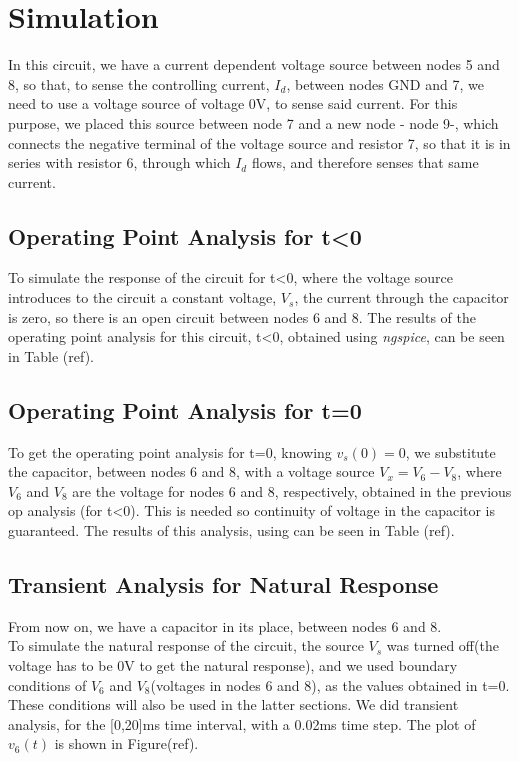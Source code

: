 \section{Simulation}
\label{sec:simulation}
In this circuit, we have a current dependent voltage source between nodes 5 and 8, so that, to sense the controlling current, $I_d$, between nodes GND and 7, we need to use a voltage source of voltage 0V, to sense said current. For this purpose, we placed this source between node 7 and a new node - node 9-, which connects the negative terminal of the voltage source and resistor 7, so that it is in series with resistor 6, through which $I_d$ flows, and therefore senses that same current.\\
\subsection{Operating Point Analysis for t\textless0}
To simulate the response of the circuit for t\textless0, where the voltage source introduces to the circuit a constant voltage, $V_s$, the current through the capacitor is zero, so there is an open circuit between nodes 6 and 8. The results of the operating point analysis for this circuit, t\textless0, obtained using \textit{ngspice}, can be seen in Table (ref).\\

\subsection{Operating Point Analysis for t=0}
To get the operating point analysis for t=0, knowing $v_s(0)=0$, we substitute the capacitor, between nodes 6 and 8, with a voltage source $V_x=V_6-V_8$, where $V_6$ and $V_8$ are the voltage for nodes 6 and 8, respectively, obtained in the previous op analysis (for t\textless0). This is needed so continuity of voltage in the capacitor is guaranteed. The results of this analysis, using  can be seen in Table (ref).\\
\subsection{Transient Analysis for Natural Response}
From now on, we have a capacitor in its place, between nodes 6 and 8.\\
To simulate the natural response of the circuit, the source $V_s$ was turned off(the voltage has to be 0V to get the natural response), and we used boundary conditions of $V_6$ and $V_8$(voltages in nodes 6 and 8), as the values obtained in t=0. These conditions will also be used in the latter sections. We did transient analysis, for the [0,20]ms time interval, with a 0.02ms time step. The plot of $v_{6}(t)$ is shown in Figure(ref).\\
